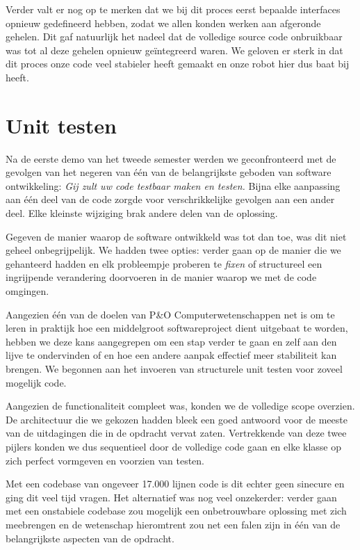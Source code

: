 \documentclass[12pt,a4paper]{report}
\begin{document}
Verder valt er nog op te merken dat we bij dit proces eerst bepaalde interfaces opnieuw gedefineerd hebben, zodat we allen konden werken aan afgeronde gehelen. Dit gaf natuurlijk het nadeel dat de volledige source code onbruikbaar was tot al deze gehelen opnieuw ge\"integreerd waren. We geloven er sterk in dat dit proces onze code veel stabieler heeft gemaakt en onze robot hier dus baat bij heeft.

\section{Unit testen}
\label{unittesten}

Na de eerste demo van het tweede semester werden we geconfronteerd met de gevolgen van het negeren van \'e\'en van de belangrijkste geboden van software ontwikkeling: \emph{Gij zult uw code testbaar maken en testen.} Bijna elke aanpassing aan \'e\'en deel van de code zorgde voor verschrikkelijke gevolgen aan een ander deel. Elke kleinste wijziging brak andere delen van de oplossing.

Gegeven de manier waarop de software ontwikkeld was tot dan toe, was dit niet geheel onbegrijpelijk. We hadden twee opties: verder gaan op de manier die we gehanteerd hadden en elk probleempje proberen te \emph{fixen} of structureel een ingrijpende verandering doorvoeren in de manier waarop we met de code omgingen.

Aangezien \'e\'en van de doelen van P\&O Computerwetenschappen net is om te leren in praktijk hoe een middelgroot softwareproject dient uitgebaat te worden, hebben we deze kans aangegrepen om een stap verder te gaan en zelf aan den lijve te ondervinden of en hoe een andere aanpak effectief meer stabiliteit kan brengen. We begonnen aan het invoeren van structurele unit testen voor zoveel mogelijk code.

Aangezien de functionaliteit compleet was, konden we de volledige scope overzien. De architectuur die we gekozen hadden bleek een goed antwoord voor de meeste van de uitdagingen die in de opdracht vervat zaten. Vertrekkende van deze twee pijlers konden we dus sequentieel door de volledige code gaan en elke klasse op zich perfect vormgeven en voorzien van testen.

Met een codebase van ongeveer 17.000 lijnen code is dit echter geen sinecure en ging dit veel tijd vragen. Het alternatief was nog veel onzekerder: verder gaan met een onstabiele codebase zou mogelijk een onbetrouwbare oplossing met zich meebrengen en de wetenschap hieromtrent zou net een falen zijn in \'e\'en van de belangrijkste aspecten van de opdracht.
\end{document}
